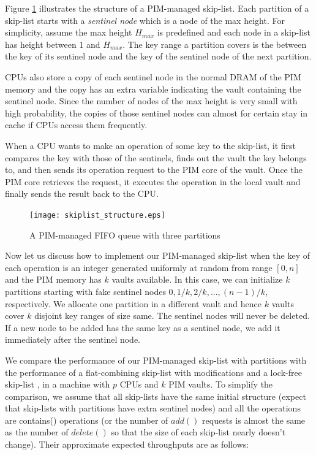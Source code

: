 \documentclass[11pt]{article}
\begin{document}
Figure \ref{figure:skiplist_structure} illustrates the structure of a PIM-managed skip-list.
Each partition of a skip-list starts with a \emph{sentinel node}
which is a node of the max height. For simplicity, assume the max height $H_{max}$ 
is predefined and each node in a skip-list has height between 1 and $H_{max}$.
The key range a partition covers is the between the key of its sentinel node and
the key of the sentinel node of the next partition.

CPUs also store a copy of each sentinel node in the normal DRAM of the PIM memory 
and the copy has an extra variable indicating the vault containing the sentinel node.
Since the number of nodes of the max height is very small with high probability, 
the copies of those sentinel nodes can almost for certain stay in cache
if CPUs access them frequently.

When a CPU wants to make an operation of some key to the skip-list,
it first compares the key with those of the sentinels, finds out the vault
the key belongs to, and then sends its operation request to
the PIM core of the vault.
Once the PIM core retrieves the request, it executes the operation in the local vault 
and finally sends the result back to the CPU.


\begin{figure}[ht!]
\centering
\texttt{[image: skiplist\_structure.eps]}
\caption{A PIM-managed FIFO queue with three partitions}
\label{figure:skiplist_structure}
\end{figure}

Now let us discuss how to implement our PIM-managed skip-list
when the key of each operation is an integer generated uniformly at random
from range $[0, n]$ and the PIM memory has $k$ vaults available.
In this case, we can initialize $k$ partitions starting with fake sentinel nodes
$0, 1/k, 2/k,..., (n-1)/k$, respectively.
We allocate one partition in a different vault and hence $k$ vaults cover
$k$ disjoint key ranges of size same.
The sentinel nodes will never be deleted.
If a new node to be added has the same key as a sentinel node,
we add it immediately after the sentinel node.

We compare the performance of our PIM-managed skip-list with partitions 
with the performance of a flat-combining skip-list \cite{Hendler10} with modifications
and a lock-free skip-list \cite{Herlihy08}, 
in a machine with $p$ CPUs and $k$ PIM vaults.
To simplify the comparison, we assume that all skip-lists have the same
initial structure (expect that skip-lists with partitions have extra sentinel nodes)
and all the operations are contains() operations
(or the number of $add()$ requests is almost the same as the number of $delete()$ 
so that the size of each skip-list nearly doesn't change).
Their approximate expected throughputs are as follows:
\end{document}
